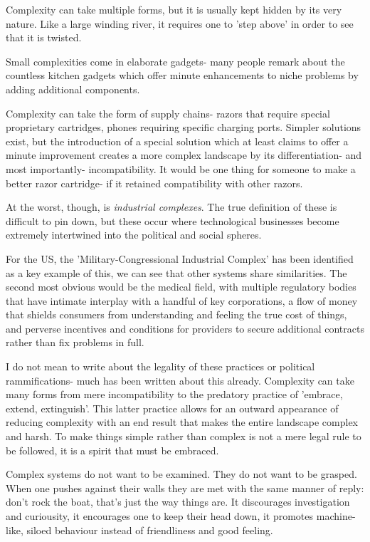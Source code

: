 \documentclass[letterpaper]{article}
\begin{document}
Complexity can take multiple forms, but it is usually kept hidden by its very nature. Like a large winding river, it requires one to 'step above' in order to see that it is twisted.

Small complexities come in elaborate gadgets- many people remark about the countless kitchen gadgets which offer minute enhancements to niche problems by adding additional components.

Complexity can take the form of supply chains- razors that require special proprietary cartridges, phones requiring specific charging ports. Simpler solutions exist, but the introduction of a special solution which at least claims to offer a minute improvement creates a more complex landscape by its differentiation- and most importantly- incompatibility. It would be one thing for someone to make a better razor cartridge- if it retained compatibility with other razors.

At the worst, though, is \textit{industrial complexes}. The true definition of these is difficult to pin down, but these occur where technological businesses become extremely intertwined into the political and social spheres.

For the US, the 'Military-Congressional Industrial Complex' has been identified as a key example of this, we can see that other systems share similarities. The second most obvious would be the medical field, with multiple regulatory bodies that have intimate interplay with a handful of key corporations, a flow of money that shields consumers from understanding and feeling the true cost of things, and perverse incentives and conditions for providers to secure additional contracts rather than fix problems in full.

I do not mean to write about the legality of these practices or political rammifications- much has been written about this already. Complexity can take many forms from mere incompatibility to the predatory practice of 'embrace, extend, extinguish'. This latter practice allows for an outward appearance of reducing complexity with an end result that makes the entire landscape complex and harsh. To make things simple rather than complex is not a mere legal rule to be followed, it is a spirit that must be embraced.

Complex systems do not want to be examined. They do not want to be grasped. When one pushes against their walls they are met with the same manner of reply: don't rock the boat, that's just the way things are. It discourages investigation and curiousity, it encourages one to keep their head down, it promotes machine-like, siloed behaviour instead of friendliness and good feeling.
\end{document}
